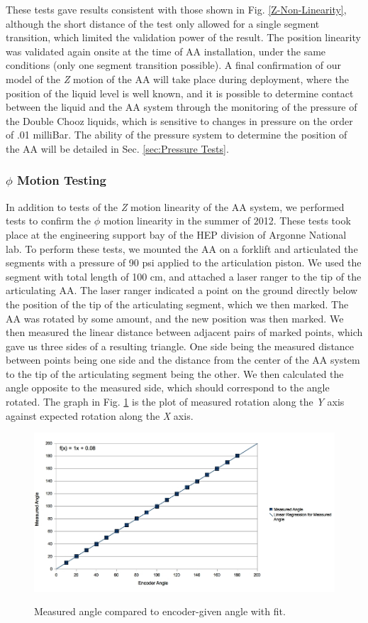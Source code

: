 These tests gave results consistent with those shown in Fig. \ref{Z-Non-Linearity}, although the short distance of the test only allowed for a single segment transition, which limited the validation power of the result. The position linearity was validated again onsite at the time of AA installation, under the same conditions (only one segment transition possible). A final confirmation of our model of the \emph{Z} motion of the AA will take place during deployment, where the position of the liquid level is well known, and it is possible to determine contact between the liquid and the AA system through the monitoring of the pressure of the Double Chooz liquids, which is sensitive to changes in pressure on the order of .01 milliBar. The ability of the pressure system to determine the position of the AA will be detailed in Sec. \ref{sec:Pressure Tests}.


\subsubsection{$\phi$ Motion Testing}
In addition to tests of the \emph{Z} motion linearity of the AA system, we performed tests to confirm the $\phi$ motion linearity in the summer of 2012. These tests took place at the engineering support bay of the HEP division of Argonne National lab. To perform these tests, we mounted the AA on a forklift and articulated the segments with a pressure of 90 psi applied to the articulation piston. We used the segment with total length of 100 cm,  and attached a laser ranger to the tip of the articulating AA. The laser ranger indicated a point on the ground directly below the position of the tip of the articulating segment, which we then marked. The AA was rotated by some amount, and the new position was then marked. We then measured the linear distance between adjacent pairs of marked points, which gave us three sides of a resulting triangle. One side being the measured distance between points being one side and the distance from the center of the AA system to the tip of the articulating segment being the other. We then calculated the angle opposite to the measured side, which should correspond to the angle rotated. The graph in Fig. \ref{Phi-Linearity} is the plot of measured rotation along the \emph{Y} axis against expected rotation along the \emph{X} axis. 

\begin{figure}
\caption{Measured angle compared to encoder-given angle with fit.}
\includegraphics[width=\textwidth]{AA/Phi_Linearity.jpg}
\label{Phi-Linearity}
\end{figure}

